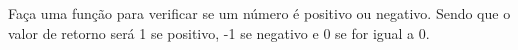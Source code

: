 
\question[10]

Faça uma função para verificar se um número é positivo ou negativo. Sendo que o valor de retorno será 1 se positivo, -1 se negativo e 0 se for igual a 0.